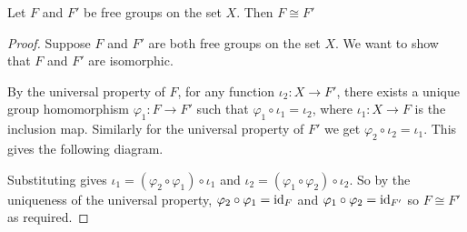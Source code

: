 \begin{theorem}
    Let $F$ and $F'$ be free groups on the set $X$. Then $F \cong F'$
\end{theorem}

\begin{proof}
    Suppose \( F\) and \( F' \) are both free groups on the set \( X \). We want to show that \( F \) and \( F' \) are isomorphic.

By the universal property of $F$, for any function $\iota_2: X \to F'$, there exists a unique group homomorphism $\varphi_1: F \to F'$ such that $\varphi_1 \circ \iota_1 = \iota_2$, where $\iota_1: X \to F$ is the inclusion map. Similarly for the universal property of $F'$ we get $\varphi_2 \circ \iota_2 = \iota_1$. This gives the following diagram.

\begin{center}
\end{center}

Substituting gives $\iota_1 = (\varphi_2 \circ \varphi_1) \circ \iota_1$ and $\iota_2 = (\varphi_1 \circ \varphi_2) \circ \iota_2$. So by the uniqueness of the universal property, $\varphi_2 \circ \varphi_1 = \mathrm{id}_{F}$ and $\varphi_1 \circ \varphi_2 = \mathrm{id}_{F'}$ so $F \cong F'$ as required. 
\end{proof}



